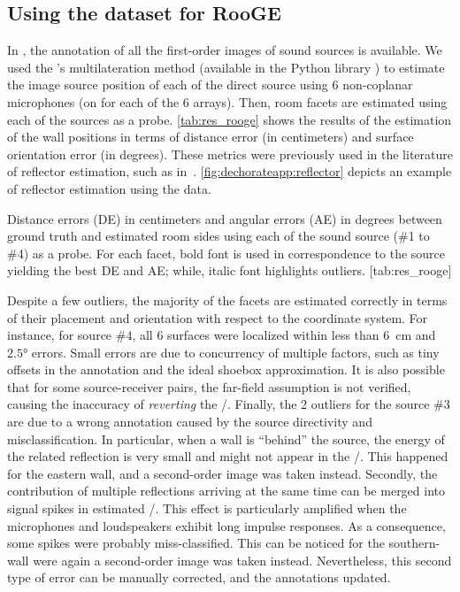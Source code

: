\subsection{Using the \dEchorate{} dataset for \acs{RooGE}}\label{subsec:dechorateapp:rooge}
In \dEchorate{}, the annotation of all the first-order images of sound sources is available.
We used the \citeauthor{Beck2008ExactProblems}'s multilateration method (available in the Python library \dEchorate{}) to estimate the image source position of each of the direct source using 6 non-coplanar microphones (on for each of the 6 arrays).
Then, room facets are estimated using each of the sources as a probe.
\cref{tab:res_rooge} shows the results of the estimation of the wall positions in terms of distance error (in centimeters) and surface orientation error (in degrees).
These metrics were previously used in the literature of reflector estimation, such as in~.
\cref{fig:dechorateapp:reflector} depicts an example of reflector estimation using the \dEchorate{} data.

\begin{table}[h!]
    \begin{sidecaption}[]{
        Distance errors (DE) in centimeters and angular errors (AE) in degrees between ground truth and estimated room sides using each of the sound source (\#1 to \#4) as a probe.
        For each facet, bold font is used in correspondence to the source yielding the best DE and AE; while, italic font highlights outliers.
        }[tab:res_rooge]
    \centering
    \small
    
    \end{sidecaption}
\end{table}

\mynewline
Despite a few outliers, the majority of the facets are estimated correctly in terms of their placement and orientation with respect to the coordinate system.
For instance, for source $\#4$, all 6 surfaces were localized within less than $6$~cm and $\ang{2.5}$ errors.
Small errors are due to concurrency of multiple factors, such as tiny offsets in the annotation and the ideal shoebox approximation.
It is also possible that for some source-receiver pairs, the far-field assumption is not verified, causing the inaccuracy of \textit{reverting} the \ISM/.
Finally, the 2 outliers for the source \#3 are due to a wrong annotation caused by the source directivity and misclassification.
In particular, when a wall is ``behind'' the source, the energy of the related reflection is very small and might not appear in the \RIRs/.
This happened for the eastern wall, and a second-order image was taken instead.
Secondly, the contribution of multiple reflections arriving at the same time can be merged into signal spikes in estimated \RIRs/.
This effect is particularly amplified when the microphones and loudspeakers exhibit long impulse responses.
As a consequence, some spikes were probably miss-classified.
This can be noticed for the southern-wall were again a second-order image was taken instead.
Nevertheless, this second type of error can be manually corrected, and the annotations updated.

